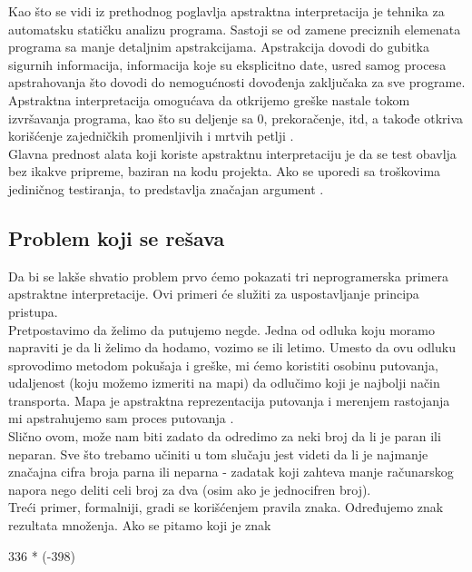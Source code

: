 
Kao što se vidi iz prethodnog poglavlja apstraktna interpretacija je tehnika za automatsku statičku analizu programa. Sastoji se od zamene preciznih elemenata programa sa manje detaljnim apstrakcijama. Apstrakcija dovodi do gubitka sigurnih informacija, informacija koje su eksplicitno date, usred samog procesa apstrahovanja što dovodi do nemogućnosti dovođenja zaključaka za sve programe. Apstraktna interpretacija omogućava da otkrijemo greške nastale tokom izvršavanja programa, kao što su deljenje sa 0, prekoračenje, itd, a takođe otkriva korišćenje zajedničkih promenljivih i mrtvih petlji \cite{AbramskyHankin}. \\ 

Glavna prednost alata koji koriste apstraktnu interpretaciju je da se test obavlja bez ikakve pripreme, baziran na kodu projekta. Ako se uporedi sa troškovima jediničnog testiranja, to predstavlja značajan argument \cite{AbramskyHankin}. \\


\subsection{Problem koji se rešava}
\label{subsec:problem1}
Da bi se lakše shvatio problem prvo ćemo pokazati tri neprogramerska primera apstraktne interpretacije. Ovi primeri će služiti za uspostavljanje principa pristupa. \\

Pretpostavimo da želimo da putujemo negde. Jedna od odluka koju moramo napraviti je da li želimo da hodamo, vozimo se ili letimo. Umesto da ovu odluku sprovodimo metodom pokušaja i greške, mi ćemo koristiti osobinu putovanja, udaljenost (koju možemo izmeriti na mapi) da odlučimo koji je najbolji način transporta. Mapa je apstraktna reprezentacija putovanja i merenjem rastojanja mi apstrahujemo sam proces putovanja \cite{AbramskyHankin}. \\

Slično ovom, može nam biti zadato da odredimo za neki broj da li je paran ili neparan. Sve što trebamo učiniti u tom slučaju jest videti da li je najmanje značajna cifra broja parna ili neparna - zadatak koji
zahteva manje računarskog napora nego deliti celi broj za dva (osim ako je jednocifren broj). \\


Treći primer, formalniji, gradi se korišćenjem pravila znaka. Određujemo znak rezultata množenja. Ako se pitamo koji je znak

336 * (-398)  

